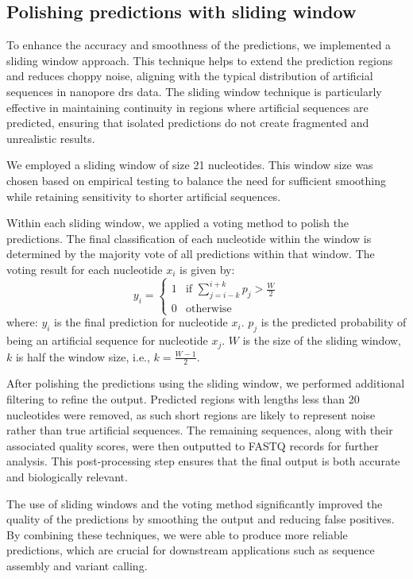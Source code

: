 \documentclass[pdflatex, sn-mathphys-num, lineno]{sn-jnl}%
\theoremstyle{thmstyleone}%
\theoremstyle{thmstyletwo}%
\theoremstyle{thmstylethree}%
\begin{document}
\subsection{Polishing predictions with sliding window}

To enhance the accuracy and smoothness of the predictions, we implemented a sliding window approach.
This technique helps to extend the prediction regions and reduces choppy noise, aligning with the typical distribution of artificial sequences in nanopore \gls{drs} data.
The sliding window technique is particularly effective in maintaining continuity in regions where artificial sequences are predicted, ensuring that isolated predictions do not create fragmented and unrealistic results.

We employed a sliding window of size 21 nucleotides.
This window size was chosen based on empirical testing to balance the need for sufficient smoothing while retaining sensitivity to shorter artificial sequences.

Within each sliding window, we applied a voting method to polish the predictions.
The final classification of each nucleotide within the window is determined by the majority vote of all predictions within that window.
The voting result for each nucleotide \( x_i \) is given by:
\[
y_i = \begin{cases}
    1 & \text{if } \sum_{j=i-k}^{i+k} p_j > \frac{W}{2} \\
    0 & \text{otherwise}
\end{cases}
\]
where: \( y_i \) is the final prediction for nucleotide \( x_i \). \( p_j \) is the predicted probability of being an artificial sequence for nucleotide \( x_j \). \( W \) is the size of the sliding window, \( k \) is half the window size, i.e., \( k = \frac{W-1}{2} \).


After polishing the predictions using the sliding window, we performed additional filtering to refine the output.
Predicted regions with lengths less than 20 nucleotides were removed, as such short regions are likely to represent noise rather than true artificial sequences.
The remaining sequences, along with their associated quality scores, were then outputted to FASTQ records for further analysis.
This post-processing step ensures that the final output is both accurate and biologically relevant.

The use of sliding windows and the voting method significantly improved the quality of the predictions by smoothing the output and reducing false positives.
By combining these techniques, we were able to produce more reliable predictions, which are crucial for downstream applications such as sequence assembly and variant calling.
\end{document}
